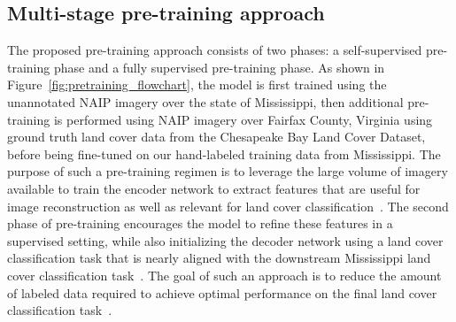 \subsection{Multi-stage pre-training approach}

The proposed pre-training approach consists of two phases: a self-supervised pre-training phase and a fully supervised pre-training phase. 
As shown in Figure~\ref{fig:pretraining_flowchart}, the model is first trained using the unannotated NAIP imagery over the state of Mississippi, then additional pre-training is performed using NAIP imagery over Fairfax County, Virginia using ground truth land cover data from the Chesapeake Bay Land Cover Dataset, before being fine-tuned on our hand-labeled training data from Mississippi.
The purpose of such a pre-training regimen is to leverage the large volume of imagery available to train the encoder network to extract features that are useful for image reconstruction as well as relevant for land cover classification~\cite{vincentExtractingComposingRobust2008}.
The second phase of pre-training encourages the model to refine these features in a supervised setting, while also initializing the decoder network using a land cover classification task that is nearly aligned with the downstream Mississippi land cover classification task~\cite{wurmSemanticSegmentationSlums2019a,martinsDeepLearningHigh2022}.
The goal of such an approach is to reduce the amount of labeled data required to achieve optimal performance on the final land cover classification task~\cite{yosinskiHowTransferableAre2014, huTransferringDeepConvolutional2015, lagrangeBenchmarkingClassificationEarthobservation2015, weissSurveyTransferLearning2016}.



